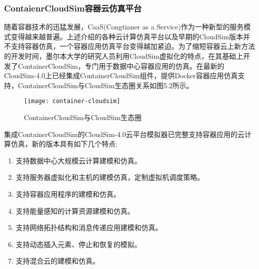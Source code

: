 \subsubsection{ContaienrCloudSim容器云仿真平台}
随着容器技术的迅猛发展，CaaS(Congtianer as a Service)作为一种新型的服务模式变得越来越普遍。上述介绍的各种云计算仿真平台以及早期的CloudSim版本并不支持容器仿真，一个容器应用仿真平台变得越加紧迫。为了缩短容器云上新方法的开发时间，墨尔本大学的研究人员利用CloudSim虚拟化的特点，在其基础上开发了ContainerCloudSim，专门用于数据中心容器应用的仿真。在最新的CloudSim-4.0上已经集成ContainerCloudSim组件，提供Docker容器应用仿真支持，ContainerCloudSim与CloudSim生态圈关系如图5.2所示。
\begin{figure}[H] %
	\centering
	\texttt{[image: container-cloudsim]}
	\caption{ContainerCloudSim与CloudSim生态圈}
\end{figure}
集成ContainerCloudSim的CloudSim-4.0云平台模拟器已完整支持容器应用的云计算仿真，新的版本具有如下几个特点:
\begin{enumerate}[(1)]
	\item 支持数据中心大规模云计算建模和仿真。
	\item 支持服务器虚拟化和主机的建模仿真，定制虚拟机调度策略。
	\item 支持容器应用程序的建模和仿真。
	\item 支持能量感知的计算资源建模和仿真。
	\item 支持网络拓扑结构和消息传递应用建模和仿真。
	\item 支持动态插入元素、停止和恢复的模拟。
	\item 支持混合云的建模和仿真。
\end{enumerate}

